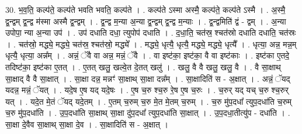 \documentclass[17pt]{extarticle}
\begin{document}
30. भ॒व॒ति॒ कल्प॑ते॒ कल्प॑ते भवति भवति॒ कल्प॑ते । . कल्प॑ते ऽस्मा अस्मै॒ कल्प॑ते॒ कल्प॑ते ऽस्मै । . अ॒स्मै॒ द्व॒न्द्वम् द्व॒न्द्व म॑स्मा अस्मै द्व॒न्द्वम् । . द्व॒न्द्व म॒न्या अ॒न्या द्व॒न्द्वम् द्व॒न्द्व म॒न्याः । . द्व॒न्द्वमिति॑ द्वं - द्वम् । . अ॒न्या उपोपा॒ न्या अ॒न्या उप॑ । . उप॑ दधाति दधा॒ त्युपोप॑ दधाति । . द॒धा॒ति॒ चत॑स्र॒ श्चत॑स्रो दधाति दधाति॒ चत॑स्रः । . चत॑स्रो॒ मद्ध्ये॒ मद्ध्ये॒ चत॑स्र॒ श्चत॑स्रो॒ मद्ध्ये᳚ । . मद्ध्ये॒ धृत्यै॒ धृत्यै॒ मद्ध्ये॒ मद्ध्ये॒ धृत्यै᳚ । . धृत्या॒ अन्न॒ मन्न॒म् धृत्यै॒ धृत्या॒ अन्न᳚म् । . अन्नं॒ ॅवै वा अन्न॒ मन्नं॒ ॅवै । . वा इष्ट॑का॒ इष्ट॑का॒ वै वा इष्ट॑काः । . इष्ट॑का ए॒तदे॒ तदिष्ट॑का॒ इष्ट॑का ए॒तत् । . ए॒तत् खलु॒ खल्वे॒त दे॒तत् खलु॑ । . खलु॒ वै वै खलु॒ खलु॒ वै । . वै सा॒क्षाथ् सा॒क्षाद् वै वै सा॒क्षात् । . सा॒क्षा दन्न॒ मन्नꣳ॑ सा॒क्षाथ् सा॒क्षा दन्न᳚म् । . सा॒क्षादिति॑ स - अ॒क्षात् । . अन्नं॒ ॅयद् यदन्न॒ मन्नं॒ ॅयत् । . यदे॒ष ए॒ष यद् यदे॒षः । . ए॒ष च॒रु श्च॒रु रे॒ष ए॒ष च॒रुः । . च॒रुर् यद् यच् च॒रु श्च॒रुर् यत् । . यदे॒त मे॒तं ॅयद् यदे॒तम् । . ए॒तम् च॒रुम् च॒रु मे॒त मे॒तम् च॒रुम् । . च॒रु मु॑प॒दधा᳚ त्युप॒दधा॑ति च॒रुम् च॒रु मु॑प॒दधा॑ति । . उ॒प॒दधा॑ति सा॒क्षाथ् सा॒क्षा दु॑प॒दधा᳚ त्युप॒दधा॑ति सा॒क्षात् । . उ॒प॒दधा॒तीत्यु॑प - दधा॑ति । . सा॒क्षा दे॒वैव सा॒क्षाथ् सा॒क्षा दे॒व । . सा॒क्षादिति॑ स - अ॒क्षात् । \newline
\end{document}
